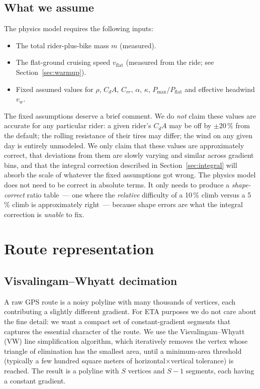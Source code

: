 \documentclass[11pt,a4paper]{article}
\begin{document}
\subsection{What we assume}

The physics model requires the following inputs:
\begin{itemize}
  \item The total rider-plus-bike mass $m$ (measured).
  \item The flat-ground cruising speed $v_{\text{flat}}$ (measured from
        the ride; see Section~\ref{sec:warmup}).
  \item Fixed assumed values for $\rho$, $C_dA$, $C_{rr}$,
        $\alpha$, $\kappa$, $P_{\max}/P_{\text{flat}}$ and effective
        headwind $v_w$.
\end{itemize}

The fixed assumptions deserve a brief comment. We do \emph{not} claim
these values are accurate for any particular rider: a given rider's
$C_dA$ may be off by $\pm 20\,\%$ from the default; the rolling
resistance of their tires may differ; the wind on any given day is
entirely unmodeled. We only claim that these values are approximately
correct, that deviations from them are slowly varying and similar
across gradient bins, and that the integral correction described in
Section~\ref{sec:integral} will absorb the scale of whatever the
fixed assumptions got wrong. The physics model does not need to be
correct in absolute terms. It only needs to produce a
\emph{shape-correct} ratio table~--- one where the \emph{relative}
difficulty of a 10\,\% climb versus a 5\,\% climb is approximately
right~--- because shape errors are what the integral correction is
\emph{unable} to fix.

\section{Route representation}
\label{sec:route}

\subsection{Visvalingam--Whyatt decimation}

A raw GPS route is a noisy polyline with many thousands of vertices,
each contributing a slightly different gradient. For ETA purposes we
do not care about the fine detail: we want a compact set of
constant-gradient segments that captures the essential character of
the route. We use the Visvalingam--Whyatt (VW) line simplification
algorithm, which iteratively removes the vertex whose triangle of
elimination has the smallest area, until a minimum-area threshold
(typically a few hundred square meters of horizontal$\times$vertical
tolerance) is reached. The result is a polyline with $S$ vertices and
$S - 1$ segments, each having a constant gradient.
\end{document}
